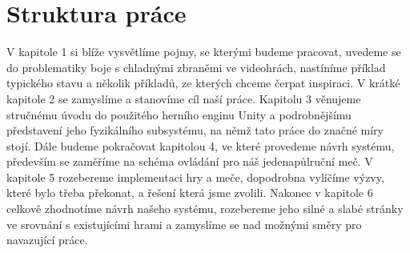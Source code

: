 \section*{Struktura práce}

V kapitole 1 si blíže vysvětlíme pojmy, se kterými budeme pracovat, uvedeme se do problematiky boje s chladnými zbraněmi ve videohrách, nastíníme příklad typického stavu a několik příkladů, ze kterých chceme čerpat inspiraci. V krátké kapitole 2 se zamyslíme a stanovíme cíl naší práce. Kapitolu 3 věnujeme stručnému úvodu do použitého herního enginu Unity a podrobnějšímu představení jeho fyzikálního subsystému, na němž tato práce do značné míry stojí. Dále budeme pokračovat kapitolou 4, ve které provedeme návrh systému, především se zaměříme na schéma ovládání pro náš jedenapůlruční meč. V kapitole 5 rozebereme implementaci hry a meče, dopodrobna vylíčíme výzvy, které bylo třeba překonat, a řešení která jsme zvolili. Nakonec v kapitole 6 celkově zhodnotíme návrh našeho systému, rozebereme jeho silné a slabé stránky ve srovnání s existujícími hrami a zamyslíme se nad možnými směry pro navazující práce.